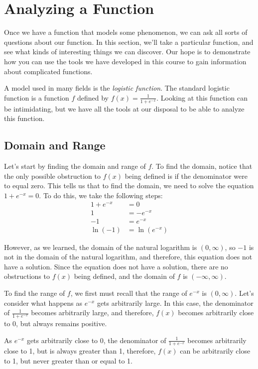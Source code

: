 \documentclass{ximera}
\begin{document}
\section{Analyzing a Function}
Once we have a function that models some phenomenon, we can ask all sorts of questions about our function. In this section, we'll take a particular function, and see what kinds of interesting things we can discover. Our hope is to demonstrate how you can use the tools we have developed in this course to gain information about complicated functions. 

A model used in many fields is the \emph{logistic function}. The standard logistic function is a function $f$ defined by $f(x) = \frac{1}{1 + e^{-x}}$. Looking at this function can be intimidating, but we have all the tools at our disposal to be able to analyze this function. 

\subsection{Domain and Range}
Let's start by finding the domain and range of $f$. To find the domain, notice that the only possible obstruction to $f(x)$ being defined is if the denominator were to equal zero. This tells us that to find the domain, we need to solve the equation $1 + e^{-x} = 0$. To do this, we take the following steps:
\begin{align*}
1 + e^{-x} & = 0 \\
1 & = -e^{-x} \\
-1 & = e^{-x} \\
\ln(-1) & = \ln(e^{-x})
\end{align*}

However, as we learned, the domain of the natural logarithm is $(0, \infty)$, so $-1$ is not in the domain of the natural logarithm, and therefore, this equation does not have a solution. Since the equation does not have a solution, there are no obstructions to $f(x)$ being defined, and the domain of $f$ is $(-\infty, \infty)$.

To find the range of $f$, we first must recall that the range of $e^{-x}$ is $(0, \infty)$. Let's consider what happens as $e^{-x}$ gets arbitrarily large. In this case, the denominator of $\frac{1}{1 + e^{-x}}$ becomes arbitrarily large, and therefore, $f(x)$ becomes arbitrarily close to 0, but always remains positive. 

As $e^{-x}$ gets arbitrarily close to 0, the denominator of $\frac{1}{1 + e^{-x}}$ becomes arbitrarily close to 1, but is always greater than 1, therefore, $f(x)$ can be arbitrarily close to 1, but never greater than or equal to 1. 
\end{document}
